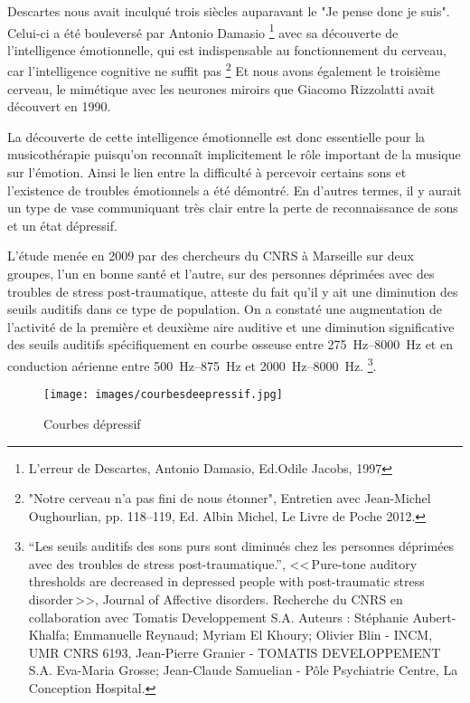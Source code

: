 Descartes nous avait inculqué trois siècles auparavant le "Je pense donc je suis". Celui-ci  a 
été bouleversé par Antonio Damasio \footnote {{L'erreur de Descartes}, Antonio Damasio, 
Ed.Odile Jacobs, 1997} 
avec sa découverte de l'intelligence émotionnelle, qui est indispensable au fonctionnement 
du 
cerveau, car  l'intelligence cognitive ne suffit pas%
\footnote{"Notre cerveau n'a pas fini de nous étonner", Entretien avec Jean-Michel 
     Oughourlian, pp. 118--119, Ed. Albin Michel, Le Livre de Poche 2012.}
Et nous avons  également le troisième cerveau, le mimétique avec les neurones miroirs que Giacomo Rizzolatti avait découvert en 1990.
 
La découverte de cette intelligence  émotionnelle est donc essentielle  pour la 
musicothérapie puisqu'on reconnaît implicitement le rôle important de la musique sur 
l'émotion.   
Ainsi le lien entre la difficulté à percevoir certains sons 
et l'existence 
de troubles émotionnels a été démontré. En d'autres termes, il y
aurait un type de vase communiquant très clair entre la perte de reconnaissance de sons et
un état dépressif.

L'étude menée en 2009 par des chercheurs du CNRS à Marseille sur deux
groupes, l'un en bonne santé et l'autre,
sur des personnes déprimées avec des troubles de stress post-traumatique, atteste du 
fait qu'il y ait une diminution des seuils auditifs dans ce type de
population. On a constaté une augmentation de l'activité de la
première et deuxième aire auditive et une diminution significative des
seuils auditifs spécifiquement en courbe osseuse entre
\SIrange{275}{8000}{\Hz} et en conduction aérienne entre
\SIrange{500}{875}{\Hz} et  \SIrange{2000}{8000}{\Hz}.
\footnote{``Les seuils auditifs des sons purs 
	sont diminués chez les personnes déprimées avec des
	troubles de stress post-traumatique.'', <<\,Pure-tone auditory 
	thresholds are decreased in depressed people with post-traumatic stress 
disorder\,>>, Journal of Affective disorders. Recherche du CNRS en collaboration
	avec Tomatis Developpement S.A. Auteurs : Stéphanie 
	Aubert-Khalfa; Emmanuelle Reynaud; Myriam El Khoury;
	Olivier Blin - INCM, UMR CNRS 6193, Jean-Pierre Granier -
	TOMATIS DEVELOPPEMENT S.A. Eva-Maria Grosse; Jean-Claude 
	Samuelian - Pôle Psychiatrie Centre, La Conception Hospital.}.

 
\begin{figure}
	\centering
	\texttt{[image: images/courbesdeepressif.jpg]}
	\caption{Courbes dépressif}
	\label{fig:courbes du dépressif}
      \end{figure}


